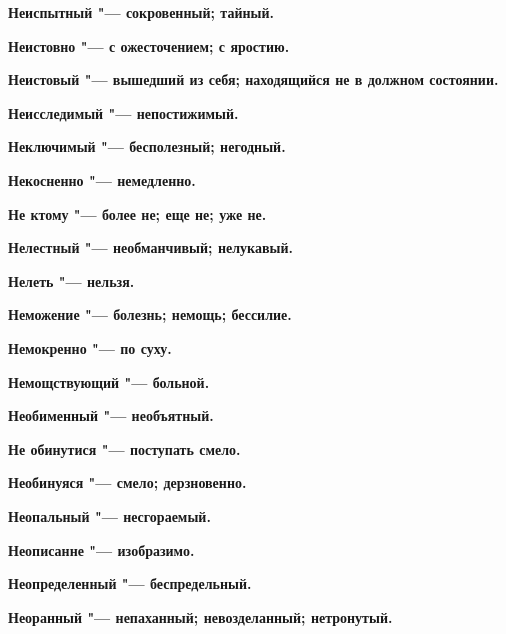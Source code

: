 \bfseries Неиспытный \normalfont{} "--- сокровенный; тайный. 




\bfseries Неистовно \normalfont{} "--- с ожесточением; с яростию. 




\bfseries Неистовый \normalfont{} "--- вышедший из себя; находящийся не в должном состоянии. 




\bfseries Неисследимый \normalfont{} "--- непостижимый. 




\bfseries Неключимый \normalfont{} "--- бесполезный; негодный. 




\bfseries Некосненно \normalfont{} "--- немедленно. 




\bfseries Не ктому \normalfont{} "--- более не; еще не; уже не. 




\bfseries Нелестный \normalfont{} "--- необманчивый; нелукавый. 




\bfseries Нелеть \normalfont{} "--- нельзя. 




\bfseries Неможение \normalfont{} "--- болезнь; немощь; бессилие. 




\bfseries Немокренно \normalfont{} "--- по суху. 




\bfseries Немощствующий \normalfont{} "--- больной. 




\bfseries Необименный \normalfont{} "--- необъятный. 




\bfseries Не обинутися \normalfont{} "--- поступать смело. 




\bfseries Необинуяся \normalfont{} "--- смело; дерзновенно. 




\bfseries Неопальный \normalfont{} "--- несгораемый. 




\bfseries Неописанне \normalfont{} "--- изобразимо. 




\bfseries Неопределенный \normalfont{} "--- беспредельный. 




\bfseries Неоранный \normalfont{} "--- непаханный; невозделанный; нетронутый. 




